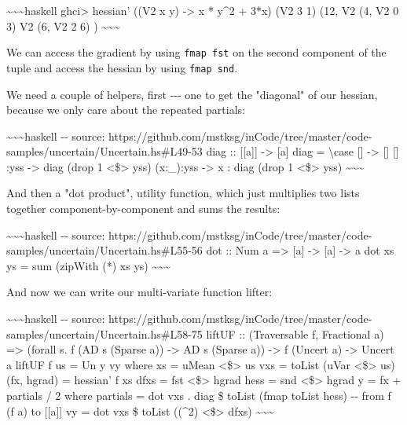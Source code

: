 \documentclass[]{article}
\begin{document}
\textasciitilde{}\textasciitilde{}\textasciitilde{}haskell ghci\textgreater{}
hessian' ((V2 x y) -\textgreater{} x * y\^{}2 + 3*x) (V2 3 1) (12, V2 (4, V2 0
3) V2 (6, V2 2 6) ) \textasciitilde{}\textasciitilde{}\textasciitilde{}

We can access the gradient by using \texttt{fmap\ fst} on the second component
of the tuple and access the hessian by using \texttt{fmap\ snd}.

We need a couple of helpers, first -\/-\/- one to get the "diagonal" of our
hessian, because we only care about the repeated partials:

\textasciitilde{}\textasciitilde{}\textasciitilde{}haskell -\/- source:
https://github.com/mstksg/inCode/tree/master/code-samples/uncertain/Uncertain.hs\#L49-53
diag :: {[}{[}a{]}{]} -\textgreater{} {[}a{]} diag = \textbackslash{}case {[}{]}
-\textgreater{} {[}{]} {[}{]} :yss -\textgreater{} diag (drop 1
\textless{}\$\textgreater{} yss) (x:\_):yss -\textgreater{} x : diag (drop 1
\textless{}\$\textgreater{} yss)
\textasciitilde{}\textasciitilde{}\textasciitilde{}

And then a "dot product", utility function, which just multiplies two lists
together component-by-component and sums the results:

\textasciitilde{}\textasciitilde{}\textasciitilde{}haskell -\/- source:
https://github.com/mstksg/inCode/tree/master/code-samples/uncertain/Uncertain.hs\#L55-56
dot :: Num a =\textgreater{} {[}a{]} -\textgreater{} {[}a{]} -\textgreater{} a
dot xs ys = sum (zipWith (*) xs ys)
\textasciitilde{}\textasciitilde{}\textasciitilde{}

And now we can write our multi-variate function lifter:

\textasciitilde{}\textasciitilde{}\textasciitilde{}haskell -\/- source:
https://github.com/mstksg/inCode/tree/master/code-samples/uncertain/Uncertain.hs\#L58-75
liftUF :: (Traversable f, Fractional a) =\textgreater{} (forall s. f (AD s
(Sparse a)) -\textgreater{} AD s (Sparse a)) -\textgreater{} f (Uncert a)
-\textgreater{} Uncert a liftUF f us = Un y vy where xs = uMean
\textless{}\$\textgreater{} us vxs = toList (uVar \textless{}\$\textgreater{}
us) (fx, hgrad) = hessian' f xs dfxs = fst \textless{}\$\textgreater{} hgrad
hess = snd \textless{}\$\textgreater{} hgrad y = fx + partials / 2 where
partials = dot vxs . diag \$ toList (fmap toList hess) -\/- from f (f a) to
{[}{[}a{]}{]} vy = dot vxs \$ toList ((\^{}2) \textless{}\$\textgreater{} dfxs)
\textasciitilde{}\textasciitilde{}\textasciitilde{}
\end{document}
